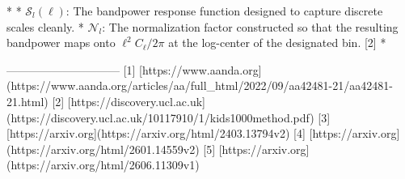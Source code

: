 * 
* $\mathcal{S}_l(\ell)$: The bandpower response function designed to capture discrete scales cleanly.
* $\mathcal{N}_l$: The normalization factor constructed so that the resulting bandpower maps onto $\ell^2 C_{\ell}/2\pi$ at the log-center of the designated bin. [2] 
* 

------------------------------
[1] [https://www.aanda.org](https://www.aanda.org/articles/aa/full_html/2022/09/aa42481-21/aa42481-21.html)
[2] [https://discovery.ucl.ac.uk](https://discovery.ucl.ac.uk/10117910/1/kids1000method.pdf)
[3] [https://arxiv.org](https://arxiv.org/html/2403.13794v2)
[4] [https://arxiv.org](https://arxiv.org/html/2601.14559v2)
[5] [https://arxiv.org](https://arxiv.org/html/2606.11309v1)
